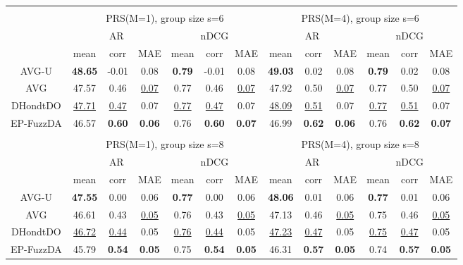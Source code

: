 \begin{tabular}{ c | c c c | c c c || c c c | c c c}
\multicolumn{12}{c}{} \\
\multicolumn{1}{c}{} & \multicolumn{6}{c}{PRS(M=1), group size s=6} & \multicolumn{6}{c}{PRS(M=4), group size s=6} \\
\multicolumn{1}{c}{} & \multicolumn{3}{c}{AR} & \multicolumn{3}{c}{nDCG} & \multicolumn{3}{c}{AR} & \multicolumn{3}{c}{nDCG} \\
& mean & corr & MAE & mean & corr & MAE & mean & corr & MAE & mean & corr & MAE \\
\hline
AVG-U & \textbf{48.65} & -0.01 & 0.08 & \textbf{0.79} & -0.01 & 0.08 & \textbf{49.03} & 0.02 & 0.08 & \textbf{0.79} & 0.02 & 0.08 \\
AVG & 47.57 & 0.46 & \underline{0.07} & 0.77 & 0.46 & \underline{0.07} & 47.92 & 0.50 & \underline{0.07} & 0.77 & 0.50 & \underline{0.07} \\
DHondtDO & \underline{47.71} & \underline{0.47} & 0.07 & \underline{0.77} & \underline{0.47} & 0.07 & \underline{48.09} & \underline{0.51} & 0.07 & \underline{0.77} & \underline{0.51} & 0.07 \\
EP-FuzzDA & 46.57 & \textbf{0.60} & \textbf{0.06} & 0.76 & \textbf{0.60} & \textbf{0.07} & 46.99 & \textbf{0.62} & \textbf{0.06} & 0.76 & \textbf{0.62} & \textbf{0.07} \\

\multicolumn{12}{c}{} \\
\multicolumn{1}{c}{} & \multicolumn{6}{c}{PRS(M=1), group size s=8} & \multicolumn{6}{c}{PRS(M=4), group size s=8} \\
\multicolumn{1}{c}{} & \multicolumn{3}{c}{AR} & \multicolumn{3}{c}{nDCG} & \multicolumn{3}{c}{AR} & \multicolumn{3}{c}{nDCG} \\
& mean & corr & MAE & mean & corr & MAE & mean & corr & MAE & mean & corr & MAE \\
\hline
AVG-U & \textbf{47.55} & 0.00 & 0.06 & \textbf{0.77} & 0.00 & 0.06 & \textbf{48.06} & 0.01 & 0.06 & \textbf{0.77} & 0.01 & 0.06 \\
AVG & 46.61 & 0.43 & \underline{0.05} & 0.76 & 0.43 & \underline{0.05} & 47.13 & 0.46 & \underline{0.05} & 0.75 & 0.46 & \underline{0.05} \\
DHondtDO & \underline{46.72} & \underline{0.44} & 0.05 & \underline{0.76} & \underline{0.44} & 0.05 & \underline{47.23} & \underline{0.47} & 0.05 & \underline{0.75} & \underline{0.47} & 0.05 \\
EP-FuzzDA & 45.79 & \textbf{0.54} & \textbf{0.05} & 0.75 & \textbf{0.54} & \textbf{0.05} & 46.31 & \textbf{0.57} & \textbf{0.05} & 0.74 & \textbf{0.57} & \textbf{0.05} \\

\end{tabular}
